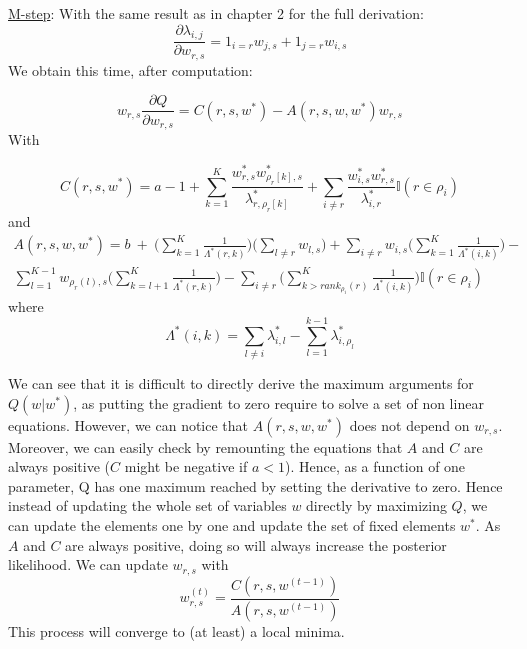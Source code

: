 \documentclass[12pt]{ociamthesis}  %
\begin{document}
	\underline{M-step}: With the same result as in chapter 2 for the full derivation:
	\begin{equation}
	\frac{\partial \lambda_{i,j}}{\partial w_{r,s}} = 1_{i = r} w_{j,s} + 1_{j = r} w_{i,s}
	\end{equation}
	We obtain this time, after computation:
	
	\begin{equation}
	w_{r,s} \frac{\partial Q}{\partial w_{r,s}} = C(r,s,w^{*}) - A(r,s,w,w^{*})w_{r,s}
	\end{equation}
	With
	
	\begin{equation}
	C(r,s,w^{*}) = a - 1 + \sum_{k = 1}^{K}\frac{w^{*}_{r,s}w^{*}_{\rho_{r}[k],s}}{\lambda^{*}_{r,\rho_{r}[k]}} + \sum_{i \neq r} \frac{w^{*}_{i,s}w^{*}_{r,s}}{\lambda^{*}_{i,r}} \mathbb{I}(r \in \rho_{i})
	\end{equation} and
	\begin{multline}
	A(r,s,w,w^{*}) = b \ + \ \bigg( \sum_{k = 1}^{K} \frac{1}{\Lambda^{*}(r,k)} \bigg) \bigg( \sum_{l \neq r} w_{l,s} \bigg) + \sum_{i \neq r} w_{i,s} \bigg( \sum_{k = 1}^{K} \frac{1}{\Lambda^{*}(i,k)} \bigg) - \\ \sum_{l = 1}^{K-1} w_{\rho_{r}(l), s} \bigg( \sum_{k = l+1}^{K} \frac{1}{\Lambda^{*}(r,k)} \bigg) - \sum_{i \neq r} \bigg( \sum_{k > rank_{\rho_{i}}(r)}^{K} \frac{1}{\Lambda^{*}(i,k)} \bigg)\mathbb{I}(r \in \rho_{i})
	\end{multline} where
	\begin{equation}
	\Lambda^{*}(i,k) = \sum_{l \neq i} \lambda^{*}_{i,l} - \sum_{l = 1}^{k-1} \lambda^{*}_{i,\rho_{l}}
	\end{equation}
	
	We can see that it is difficult to directly derive the maximum arguments for $Q(w|w^{*})$, as putting the gradient to zero require to solve a set of non linear equations. However, we can notice that $A(r,s,w,w^{*})$ does not depend on $w_{r,s}$. Moreover, we can easily check by remounting the equations that $A$ and $C$ are always positive ($C$ might be negative if $a < 1$). Hence, as a function of one parameter, Q has one maximum reached by setting the derivative to zero. Hence instead of updating the whole set of variables $w$ directly by maximizing $Q$, we can update the elements one by one and update the set of fixed elements $w^{*}$. As $A$ and $C$ are always positive, doing so will always increase the posterior likelihood. We can update $w_{r,s}$ with
	\begin{equation}
	w^{(t)}_{r,s} = \frac{C(r,s,w^{(t-1)})}{A(r,s,w^{(t-1)})}
	\end{equation}
	This process will converge to (at least) a local minima.
	
\end{document}
